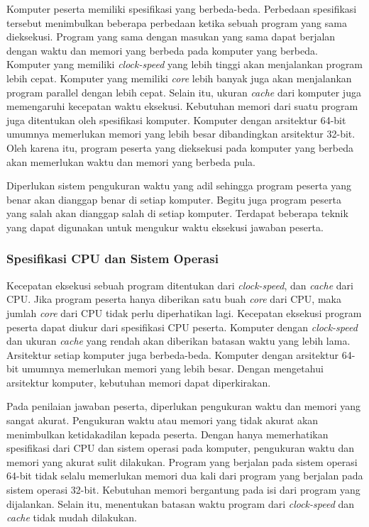 \par Komputer peserta memiliki spesifikasi yang berbeda-beda. Perbedaan spesifikasi tersebut menimbulkan beberapa perbedaan ketika sebuah program yang sama dieksekusi. Program yang sama dengan masukan yang sama dapat berjalan dengan waktu dan memori yang berbeda pada komputer yang berbeda. Komputer yang memiliki \textit{clock-speed} yang lebih tinggi akan menjalankan program lebih cepat. Komputer yang memiliki \textit{core} lebih banyak juga akan menjalankan program parallel dengan lebih cepat. Selain itu, ukuran \textit{cache} dari komputer juga memengaruhi kecepatan waktu eksekusi. Kebutuhan memori dari suatu program juga ditentukan oleh spesifikasi komputer. Komputer dengan arsitektur 64-bit umumnya memerlukan memori yang lebih besar dibandingkan arsitektur 32-bit. Oleh karena itu, program peserta yang dieksekusi pada komputer yang berbeda akan memerlukan waktu dan memori yang berbeda pula.

\par Diperlukan sistem pengukuran waktu yang adil sehingga program peserta yang benar akan dianggap benar di setiap komputer. Begitu juga program peserta yang salah akan dianggap salah di setiap komputer. Terdapat beberapa teknik yang dapat digunakan untuk mengukur waktu eksekusi jawaban peserta.

\subsubsection{Spesifikasi CPU dan Sistem Operasi}

\par Kecepatan eksekusi sebuah program ditentukan dari \textit{clock-speed}, dan \textit{cache} dari CPU. Jika program peserta hanya diberikan satu buah \textit{core} dari CPU, maka jumlah \textit{core} dari CPU tidak perlu diperhatikan lagi. Kecepatan eksekusi program peserta dapat diukur dari spesifikasi CPU peserta. Komputer dengan \textit{clock-speed} dan ukuran \textit{cache} yang rendah akan diberikan batasan waktu yang lebih lama. Arsitektur setiap komputer juga berbeda-beda. Komputer dengan arsitektur 64-bit umumnya memerlukan memori yang lebih besar. Dengan mengetahui arsitektur komputer, kebutuhan memori dapat diperkirakan.

\par Pada penilaian jawaban peserta, diperlukan pengukuran waktu dan memori yang sangat akurat. Pengukuran waktu atau memori yang tidak akurat akan menimbulkan ketidakadilan kepada peserta. Dengan hanya memerhatikan spesifikasi dari CPU dan sistem operasi pada komputer, pengukuran waktu dan memori yang akurat sulit dilakukan. Program yang berjalan pada sistem operasi 64-bit tidak selalu memerlukan memori dua kali dari program yang berjalan pada sistem operasi 32-bit. Kebutuhan memori bergantung pada isi dari program yang dijalankan. Selain itu, menentukan batasan waktu program dari \textit{clock-speed} dan \textit{cache} tidak mudah dilakukan. 

